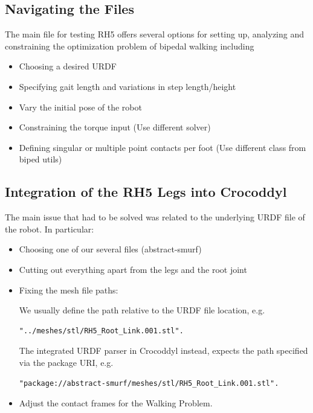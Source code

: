 \subsection{Navigating the Files}
The main file for testing RH5 offers several options for setting up, analyzing and constraining the optimization problem of bipedal walking including
\begin{itemize}
\item Choosing a desired URDF 
\item Specifying gait length and variations in step length/height
\item Vary the initial pose of the robot
\item Constraining the torque input (Use different solver)
\item Defining singular or multiple point contacts per foot (Use different class from biped utils)
\end{itemize}

\subsection{Integration of the RH5 Legs into Crocoddyl}
The main issue that had to be solved was related to the underlying URDF file of the robot. In particular: 
\begin{itemize}
\item Choosing one of our several files (abstract-smurf)
\item Cutting out everything apart from the legs and the root joint
\item Fixing the mesh file paths: 

We usually define the path relative to the URDF file location, e.g.
\begin{verbatim}
"../meshes/stl/RH5_Root_Link.001.stl".
\end{verbatim}
The integrated URDF parser in Crocoddyl instead, expects the path specified via the package URI, e.g. 
\begin{verbatim}
"package://abstract-smurf/meshes/stl/RH5_Root_Link.001.stl".
\end{verbatim}
\item Adjust the contact frames for the Walking Problem.
\end{itemize}

